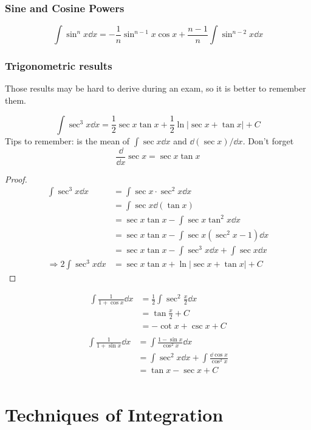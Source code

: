 \documentclass{overview}
\begin{document}
\subsubsection{Sine and Cosine Powers}
\[
	\int \sin^n x \dd x = -\frac{1}{n} \sin^{n-1} x \cos x
	+ \frac{n-1}{n} \int \sin^{n-2} x \dd x
\]
\subsubsection{Trigonometric results}

Those results may be hard to derive during an exam, so it is better to
remember them.

\[
	\int \sec^{3}x \dd x = \frac{1}{2} \sec x \tan x + \frac{1}{2} \ln|\sec x + \tan x| + C
\] 
Tips to remember: is the mean of $\int \sec x \dd x$ and $\dd (\sec x) / \dd x$.
Don't forget
\[
	\frac{\dd}{\dd x} \sec x = \sec x \tan x
\] 

\begin{proof}
	\[
		\begin{aligned}
		\int \sec^3 x \dd x
		&= \int \sec x \cdot \sec^2 x \dd x \\
		&= \int \sec x \dd (\tan x) \\
		&= \sec x \tan x - \int \sec x \tan^2 x \dd x \\
		&= \sec x \tan x - \int \sec x (\sec^2 x - 1) \dd x \\
		&= \sec x \tan x - \int \sec^3 x \dd x + \int \sec x \dd x \\
		\Rightarrow 2 \int \sec^3 x \dd x
		&= \sec x \tan x + \ln|\sec x + \tan x| + C
		\end{aligned}
	\]
\end{proof}

\[
	\begin{aligned}
	\int \frac{1}{1+\cos x} \dd x
	&= \frac{1}{2} \int \sec^2 \frac{x}{2} \dd x \\
	&= \tan \frac{x}{2} + C \\
	&= -\cot x + \csc x + C \\
	\end{aligned}
\] 
\[
	\begin{aligned}
	\int \frac{1}{1+\sin x} \dd x
	&= \int \frac{1-\sin x}{\cos^2 x} \dd x \\
	&= \int \sec^2 x \dd x + \int \frac{\dd \cos x}{\cos^2 x} \\
	&= \tan x - \sec x + C \\
	\end{aligned}
\] 

\section{Techniques of Integration}
\end{document}
